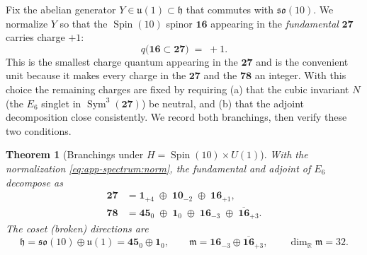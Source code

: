 \documentclass[11pt]{article}
\theoremstyle{plain}
\newtheorem{theorem}{Theorem}[section]
\theoremstyle{definition}
\theoremstyle{remark}
\newcommand{\Spin}{\operatorname{Spin}}
\newcommand{\Sym}{\operatorname{Sym}}
\begin{document}
Fix the abelian generator $Y\in\mathfrak u(1)\subset\mathfrak h$ that
commutes with $\mathfrak{so}(10)$. We normalize $Y$ so that the
$\Spin(10)$ spinor $\mathbf{16}$ appearing in the \emph{fundamental}
$\mathbf{27}$ carries charge $+1$:
\begin{equation}
  q\bigl(\mathbf{16}\subset\mathbf{27}\bigr) \;=\; +1 .
  \label{eq:app-spectrum:norm}
\end{equation}
This is the smallest charge quantum appearing in the $\mathbf{27}$ and
is the convenient unit because it makes every charge in the
$\mathbf{27}$ and the $\mathbf{78}$ an integer. With this choice the
remaining charges are fixed by requiring (a) that the cubic invariant
$N$ (the $E_6$ singlet in $\Sym^3(\mathbf{27})$) be neutral, and (b)
that the adjoint decomposition close consistently. We record both
branchings, then verify these two conditions.

\begin{theorem}[Branchings under $H=\Spin(10)\times U(1)$]
\label{thm:app-spectrum:branchings}
With the normalization \eqref{eq:app-spectrum:norm}, the fundamental and
adjoint of $E_6$ decompose as
\begin{align}
  \mathbf{27}
    &= \mathbf{1}_{+4}\;\oplus\;\mathbf{10}_{-2}\;\oplus\;\mathbf{16}_{+1},
    \label{eq:app-spectrum:27}\\[2pt]
  \mathbf{78}
    &= \mathbf{45}_{0}\;\oplus\;\mathbf{1}_{0}\;\oplus\;
       \mathbf{16}_{-3}\;\oplus\;\overline{\mathbf{16}}_{+3}.
    \label{eq:app-spectrum:78}
\end{align}
The coset (broken) directions are
\begin{equation}
  \mathfrak h = \mathfrak{so}(10)\oplus\mathfrak u(1)
     = \mathbf{45}_{0}\oplus\mathbf{1}_{0},
  \qquad
  \mathfrak m = \mathbf{16}_{-3}\oplus\overline{\mathbf{16}}_{+3},
  \qquad \dim_{\mathbb R}\mathfrak m = 32 .
  \label{eq:app-spectrum:hm}
\end{equation}
\end{theorem}
\end{document}
